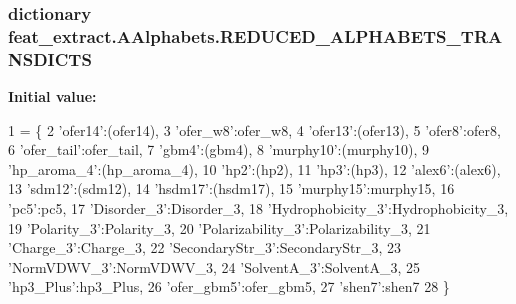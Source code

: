 \subsubsection[{R\+E\+D\+U\+C\+E\+D\+\_\+\+A\+L\+P\+H\+A\+B\+E\+T\+S\+\_\+\+T\+R\+A\+N\+S\+D\+I\+C\+T\+S}]{\setlength{\rightskip}{0pt plus 5cm}dictionary feat\+\_\+extract.\+A\+Alphabets.\+R\+E\+D\+U\+C\+E\+D\+\_\+\+A\+L\+P\+H\+A\+B\+E\+T\+S\+\_\+\+T\+R\+A\+N\+S\+D\+I\+C\+T\+S}\label{namespacefeat__extract_1_1_a_alphabets_a0ba42469c15f3f9762f1e60013f0a495}
{\bfseries Initial value\+:}
\begin{DoxyCode}
1 = \{
2 \textcolor{stringliteral}{'ofer14'}:(ofer14),
3 \textcolor{stringliteral}{'ofer\_w8'}:ofer\_w8,
4 \textcolor{stringliteral}{'ofer13'}:(ofer13),
5 \textcolor{stringliteral}{'ofer8'}:ofer8,
6 \textcolor{stringliteral}{'ofer\_tail'}:ofer\_tail,
7 \textcolor{stringliteral}{'gbm4'}:(gbm4),
8 \textcolor{stringliteral}{'murphy10'}:(murphy10),
9 \textcolor{stringliteral}{'hp\_aroma\_4'}:(hp\_aroma\_4),
10 \textcolor{stringliteral}{'hp2'}:(hp2),
11 \textcolor{stringliteral}{'hp3'}:(hp3),
12 \textcolor{stringliteral}{'alex6'}:(alex6),
13 \textcolor{stringliteral}{'sdm12'}:(sdm12),
14 \textcolor{stringliteral}{'hsdm17'}:(hsdm17),
15 \textcolor{stringliteral}{'murphy15'}:murphy15,
16 \textcolor{stringliteral}{'pc5'}:pc5,
17 \textcolor{stringliteral}{'Disorder\_3'}:Disorder\_3,
18 \textcolor{stringliteral}{'Hydrophobicity\_3'}:Hydrophobicity\_3,
19 \textcolor{stringliteral}{'Polarity\_3'}:Polarity\_3,
20 \textcolor{stringliteral}{'Polarizability\_3'}:Polarizability\_3,
21 \textcolor{stringliteral}{'Charge\_3'}:Charge\_3,
22 \textcolor{stringliteral}{'SecondaryStr\_3'}:SecondaryStr\_3,
23 \textcolor{stringliteral}{'NormVDWV\_3'}:NormVDWV\_3,
24 \textcolor{stringliteral}{'SolventA\_3'}:SolventA\_3,
25 \textcolor{stringliteral}{'hp3\_Plus'}:hp3\_Plus,
26 \textcolor{stringliteral}{'ofer\_gbm5'}:ofer\_gbm5,
27 \textcolor{stringliteral}{'shen7'}:shen7
28 \}
\end{DoxyCode}
\hypertarget{namespacefeat__extract_1_1_a_alphabets_aca4608a7d25630074f6e1a0750c7a2c8}{}
